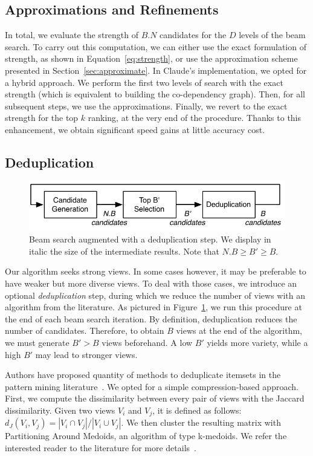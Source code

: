 \subsection{Approximations and Refinements}
In total, we evaluate the strength of $B.N$ candidates for the $D$
levels of the beam search. To carry out this computation,  we can either use
the exact formulation of strength, as shown in Equation~\ref{eq:strength}, or
use the approximation scheme presented in Section~\ref{sec:approximate}. In
Claude's implementation, we opted for a hybrid approach. We perform the first
two levels of search with the exact strength (which is equivalent to building
the co-dependency graph).  Then, for all subsequent steps, we use the
approximations. Finally, we revert to the exact strength for the top $k$
ranking, at the very end of the procedure. Thanks to this enhancement, we
obtain significant speed gains at little accuracy cost.

\subsection{Deduplication}
\label{sec:variety}

\begin{figure}[t!]
\centering
\includegraphics[width=\columnwidth]{images/deduplication}
\caption{Beam search augmented with a deduplication step. We display in italic
the size of the intermediate results. Note that $N.B \geq B' \geq B$.}
\label{pic:deduplication}
\end{figure}
Our algorithm seeks strong views. In some cases however, it may be preferable
to have weaker but more diverse views. To deal with those cases, we introduce
an optional \emph{deduplication} step, during which we reduce the number of
views with an algorithm from the literature. As pictured in
Figure~\ref{pic:deduplication}, we run this procedure at the end of each
beam search iteration.  By definition, deduplication reduces the number
of candidates. Therefore, to obtain $B$ views at the end of the algorithm, we
must generate $B' > B$ views beforehand. A low $B'$ yields more variety,
while a high $B'$ may lead to stronger views.

Authors have proposed quantity of methods to deduplicate itemsets in the
pattern mining literature~\cite{xin2005mining, van2006compression}. We opted
for a simple compression-based approach. First, we compute the dissimilarity
between every pair of views with the Jaccard dissimilarity. Given two views
$V_i$ and $V_j$, it is defined as follows: $d_J(V_i, V_j) = |V_i \cap V_j | / |
V_i \cup V_j |$. We then cluster the resulting matrix with Partitioning Around
Medoids, an algorithm of type k-medoids.  We refer the interested reader to the
literature for more details~\cite{kaufman2009finding}.






